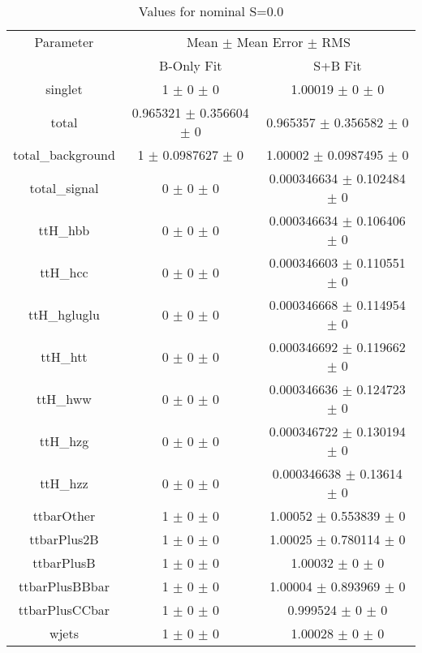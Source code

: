 \begin{table}
\centering
\caption{Values for nominal S=0.0}
\begin{tabular}{ccc}
\toprule
Parameter & \multicolumn{2}{c}{Mean $\pm$ Mean Error $\pm$ RMS}\\
 & B-Only Fit & S+B Fit\\
\midrule
singlet & \num{1} $\pm$ \num{0} $\pm$ \num{0} & \num{1.00019} $\pm$ \num{0} $\pm$ \num{0}\\
total & \num{0.965321} $\pm$ \num{0.356604} $\pm$ \num{0} & \num{0.965357} $\pm$ \num{0.356582} $\pm$ \num{0}\\
total\_background & \num{1} $\pm$ \num{0.0987627} $\pm$ \num{0} & \num{1.00002} $\pm$ \num{0.0987495} $\pm$ \num{0}\\
total\_signal & \num{0} $\pm$ \num{0} $\pm$ \num{0} & \num{0.000346634} $\pm$ \num{0.102484} $\pm$ \num{0}\\
ttH\_hbb & \num{0} $\pm$ \num{0} $\pm$ \num{0} & \num{0.000346634} $\pm$ \num{0.106406} $\pm$ \num{0}\\
ttH\_hcc & \num{0} $\pm$ \num{0} $\pm$ \num{0} & \num{0.000346603} $\pm$ \num{0.110551} $\pm$ \num{0}\\
ttH\_hgluglu & \num{0} $\pm$ \num{0} $\pm$ \num{0} & \num{0.000346668} $\pm$ \num{0.114954} $\pm$ \num{0}\\
ttH\_htt & \num{0} $\pm$ \num{0} $\pm$ \num{0} & \num{0.000346692} $\pm$ \num{0.119662} $\pm$ \num{0}\\
ttH\_hww & \num{0} $\pm$ \num{0} $\pm$ \num{0} & \num{0.000346636} $\pm$ \num{0.124723} $\pm$ \num{0}\\
ttH\_hzg & \num{0} $\pm$ \num{0} $\pm$ \num{0} & \num{0.000346722} $\pm$ \num{0.130194} $\pm$ \num{0}\\
ttH\_hzz & \num{0} $\pm$ \num{0} $\pm$ \num{0} & \num{0.000346638} $\pm$ \num{0.13614} $\pm$ \num{0}\\
ttbarOther & \num{1} $\pm$ \num{0} $\pm$ \num{0} & \num{1.00052} $\pm$ \num{0.553839} $\pm$ \num{0}\\
ttbarPlus2B & \num{1} $\pm$ \num{0} $\pm$ \num{0} & \num{1.00025} $\pm$ \num{0.780114} $\pm$ \num{0}\\
ttbarPlusB & \num{1} $\pm$ \num{0} $\pm$ \num{0} & \num{1.00032} $\pm$ \num{0} $\pm$ \num{0}\\
ttbarPlusBBbar & \num{1} $\pm$ \num{0} $\pm$ \num{0} & \num{1.00004} $\pm$ \num{0.893969} $\pm$ \num{0}\\
ttbarPlusCCbar & \num{1} $\pm$ \num{0} $\pm$ \num{0} & \num{0.999524} $\pm$ \num{0} $\pm$ \num{0}\\
wjets & \num{1} $\pm$ \num{0} $\pm$ \num{0} & \num{1.00028} $\pm$ \num{0} $\pm$ \num{0}\\
\bottomrule
\end{tabular}
\end{table}